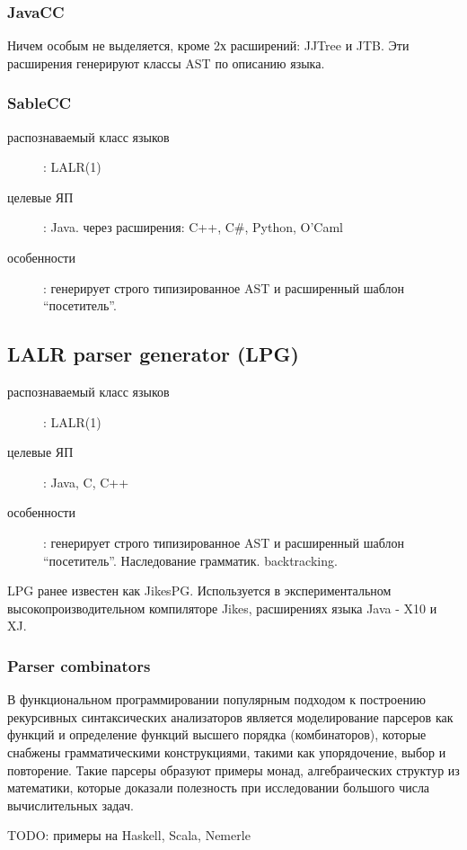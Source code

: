 \documentclass[a4paper,12pt]{article}
\begin{document}
\subsubsection{JavaCC}
Ничем особым не выделяется, кроме 2х расширений: JJTree
и JTB. Эти расширения генерируют классы AST по описанию языка.

\subsubsection{SableCC}
\begin{description}
  \item[распознаваемый класс языков]: LALR(1)
  \item[целевые ЯП]: Java. через расширения: C++, C\#, Python, O'Caml
  \item[особенности]: генерирует строго типизированное AST и расширенный
 	шаблон ``посетитель''.
\end{description}

\subsection{LALR parser generator (LPG)}
\begin{description}
  \item[распознаваемый класс языков]: LALR(1)
  \item[целевые ЯП]: Java, C, C++
  \item[особенности]: генерирует строго типизированное AST и расширенный
 	шаблон ``посетитель''. Наследование грамматик. backtracking.
\end{description}

LPG ранее известен как JikesPG. Используется в экспериментальном
высокопроизводительном компиляторе Jikes, расширениях языка Java - X10 и XJ.

\subsubsection{Parser combinators}
В функциональном программировании популярным подходом к построению рекурсивных
синтаксических анализаторов является моделирование парсеров как функций и
определение функций высшего порядка (комбинаторов), которые снабжены
грамматическими конструкциями, такими как упорядочение, выбор и повторение.
Такие парсеры образуют примеры монад, алгебраических структур из математики,
которые доказали полезность при исследовании большого числа вычислительных
задач.

TODO: примеры на Haskell, Scala, Nemerle
\end{document}
